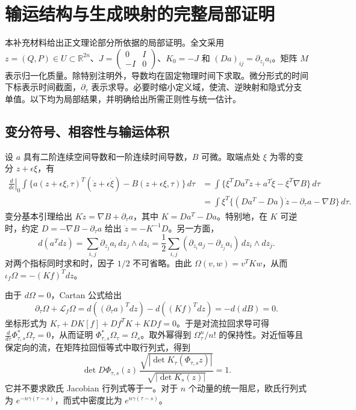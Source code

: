 \section{输运结构与生成映射的完整局部证明}
\label{sec:sup-theory}

本补充材料给出正文理论部分所依据的局部证明。全文采用 $z=(Q,P)\in U\subset\mathbb R^{2n}$、$J=\left(\begin{smallmatrix}0&I\\-I&0\end{smallmatrix}\right)$、$K_0=-J$ 和 $(Da)_{ij}=\partial_{z_j}a_i$。矩阵 $M$ 表示归一化质量。除特别注明外，导数均在固定物理时间下求取。微分形式的时间下标表示时间截面，$\partial_\tau$ 表示求导。必要时缩小定义域，使流、逆映射和隐式分支单值。以下均为局部结果，并明确给出所需正则性与统一估计。

\subsection{变分符号、相容性与输运体积}
设 $a$ 具有二阶连续空间导数和一阶连续时间导数，$B$ 可微。取端点处 $\xi$ 为零的变分 $z+\epsilon\xi$，有
\begin{align}
 \left.\frac{d}{d\epsilon}\right|_0
 \int \{a(z+\epsilon\xi,\tau)^T(\dot z+\epsilon\dot\xi)-B(z+\epsilon\xi,\tau)\}\,d\tau
 &=\int\{\xi^TDa^T\dot z+a^T\dot\xi-\xi^T\nabla B\}\,d\tau\\
 &=\int\xi^T\{(Da^T-Da)\dot z-\partial_\tau a-\nabla B\}\,d\tau.
 \label{eq:sup-variation}
\end{align}
变分基本引理给出 $K\dot z=\nabla B+\partial_\tau a$，其中 $K=Da^T-Da$。特别地，在 $K$ 可逆时，约定 $D=-\nabla B-\partial_\tau a$ 给出 $\dot z=-K^{-1}D$。另一方面，
\begin{equation}
 d(a^Tdz)=\sum_{i,j}\partial_{z_j}a_i\,dz_j\wedge dz_i
 =\frac12\sum_{i,j}(\partial_{z_i}a_j-\partial_{z_j}a_i)\,dz_i\wedge dz_j.
 \label{eq:sup-twoform-factor}
\end{equation}
对两个指标同时求和时，因子 $1/2$ 不可省略。由此 $\Omega(v,w)=v^TKw$，从而 $\iota_f\Omega=-(Kf)^Tdz$。

由于 $d\Omega=0$，Cartan 公式给出
\begin{equation}
 \partial_\tau\Omega+\mathcal L_f\Omega
 =d((\partial_\tau a)^Tdz)-d((Kf)^Tdz)
 =-d(dB)=0.
 \label{eq:sup-cartan}
\end{equation}
坐标形式为 $K_\tau+DK[f]+Df^TK+KDf=0$。于是对流拉回求导可得
$\frac{d}{d\tau}\Phi_{\tau,s}^*\Omega_\tau=0$，从而证明 $\Phi_{\tau,s}^*\Omega_\tau=\Omega_s$。取外幂得到 $\Omega_\tau^n/n!$ 的保持性。对近恒等且保定向的流，在矩阵拉回恒等式中取行列式，得到
\begin{equation}
 \det D\Phi_{\tau,s}(z)\,
 \frac{\sqrt{|\det K_\tau(\Phi_{\tau,s}z)|}}
      {\sqrt{|\det K_s(z)|}}=1.
 \label{eq:sup-density}
\end{equation}
它并不要求欧氏 Jacobian 行列式等于一。对于 $n$ 个动量的统一阻尼，欧氏行列式为 $e^{-n\gamma(\tau-s)}$，而式中密度比为 $e^{n\gamma(\tau-s)}$。

